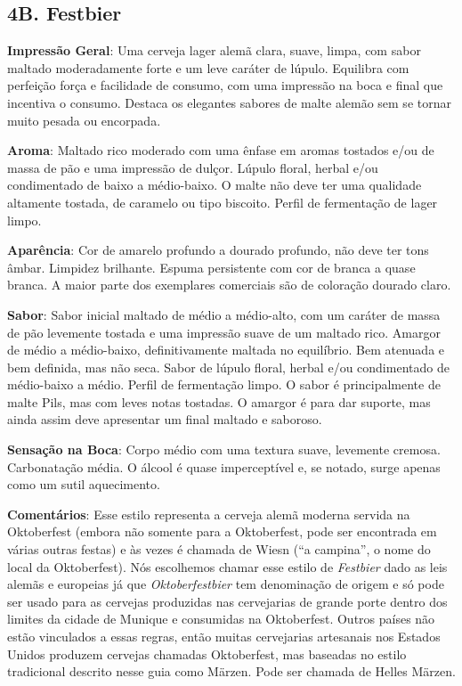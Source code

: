 \subsection*{4B. Festbier}
\textbf{Impressão Geral}: Uma cerveja lager alemã clara, suave, limpa, com sabor maltado moderadamente forte e um leve caráter de lúpulo. Equilibra com perfeição força e facilidade de consumo, com uma impressão na boca e final que incentiva o consumo. Destaca os elegantes sabores de malte alemão sem se tornar muito pesada ou encorpada.

\textbf{Aroma}: Maltado rico moderado com uma ênfase em aromas tostados e/ou de massa de pão e uma impressão de dulçor. Lúpulo floral, herbal e/ou condimentado de baixo a médio-baixo. O malte não deve ter uma qualidade altamente tostada, de caramelo ou tipo biscoito. Perfil de fermentação de lager limpo.

\textbf{Aparência}: Cor de amarelo profundo a dourado profundo, não deve ter tons âmbar. Limpidez brilhante. Espuma persistente com cor de branca a quase branca. A maior parte dos exemplares comerciais são de coloração dourado claro.

\textbf{Sabor}: Sabor inicial maltado de médio a médio-alto, com um caráter de massa de pão levemente tostada e uma impressão suave de um maltado rico. Amargor de médio a médio-baixo, definitivamente maltada no equilíbrio. Bem atenuada e bem definida, mas não seca. Sabor de lúpulo floral, herbal e/ou condimentado de médio-baixo a médio. Perfil de fermentação limpo. O sabor é principalmente de malte Pils, mas com leves notas tostadas. O amargor é para dar suporte, mas ainda assim deve apresentar um final maltado e saboroso.

\textbf{Sensação na Boca}: Corpo médio com uma textura suave, levemente cremosa. Carbonatação média. O álcool é quase imperceptível e, se notado, surge apenas como um sutil aquecimento.

\textbf{Comentários}: Esse estilo representa a cerveja alemã moderna servida na Oktoberfest (embora não somente para a Oktoberfest, pode ser encontrada em várias outras festas) e às vezes é chamada de Wiesn (“a campina”, o nome do local da Oktoberfest). Nós escolhemos chamar esse estilo de \textit{Festbier} dado as leis alemãs e europeias já que \textit{Oktoberfestbier} tem denominação de origem e só pode ser usado para as cervejas produzidas nas cervejarias de grande porte dentro dos limites da cidade de Munique e consumidas na Oktoberfest. Outros países não estão vinculados a essas regras, então muitas cervejarias artesanais nos Estados Unidos produzem cervejas chamadas Oktoberfest, mas baseadas no estilo tradicional descrito nesse guia como Märzen. Pode ser chamada de Helles Märzen.


